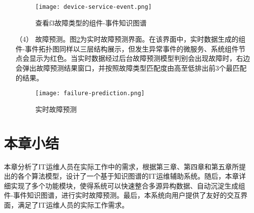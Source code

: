 \begin{itemize}
    \begin{figure}[htbp]
        \centering
        \texttt{[image: device-service-event.png]}
        \caption{查看f3故障类型的组件-事件知识图谱\label{device-service-event}}
    \end{figure}
    \item [（4）]故障预测。图\ref{failure-prediction}为实时故障预测界面。在该界面中，实时数据生成的组件-事件拓扑图同样以三层结构展示，但发生异常事件的微服务、系统组件节点会显示为红色。当实时数据经过后台故障预测模型判别会出现故障时，右边会弹出故障预测结果窗口，并按照故障类型匹配度由高至低排出前3个最匹配的结果。
    \begin{figure}[htbp]
        \centering
        \texttt{[image: failure-prediction.png]}
        \caption{实时故障预测\label{failure-prediction}}
    \end{figure}
\end{itemize}

\section{本章小结}
本章分析了IT运维人员在实际工作中的需求，根据第三章、第四章和第五章所提出的各个算法模型，设计了一个基于知识图谱的IT运维辅助系统。随后，本章详细实现了多个功能模块，使得系统可以快速整合多源异构数据、自动沉淀生成组件-事件知识图谱，进行实时故障预测。最后，本系统向用户提供了友好的交互界面，满足了IT运维人员的实际工作需求。
